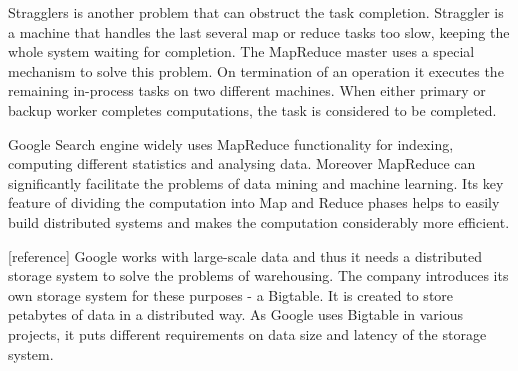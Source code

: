 Stragglers is another problem that can obstruct the task completion.
Straggler is a machine that handles the last several map or reduce tasks too slow, keeping the whole system waiting for completion.
The MapReduce master uses a special mechanism to solve this problem.
On termination of an operation it executes the remaining in-process tasks on two different machines.
When either primary or backup worker completes computations, the task is considered to be completed.

Google Search engine widely uses MapReduce functionality for indexing, computing different statistics and analysing data.  
Moreover MapReduce can significantly facilitate the problems of data mining and machine learning.
Its key feature of dividing the computation into Map and Reduce phases helps to easily build distributed systems and makes the computation considerably more efficient.  

[reference]
Google works with large-scale data and thus it needs a distributed storage system to solve the problems of warehousing.
The company introduces its own storage system for these purposes - a Bigtable.
It is created to store petabytes of data in a distributed way.
As Google uses Bigtable in various projects, it puts different requirements on data size and latency of the storage system. 
 

% 
% 
% 
% 

